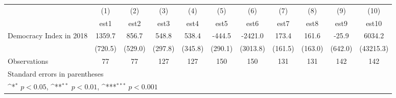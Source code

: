 {
\def\sym#1{\ifmmode^{#1}\else\(^{#1}\)\fi}
\begin{tabular}{l*{10}{c}}
\hline\hline
                    &\multicolumn{1}{c}{(1)}         &\multicolumn{1}{c}{(2)}         &\multicolumn{1}{c}{(3)}         &\multicolumn{1}{c}{(4)}         &\multicolumn{1}{c}{(5)}         &\multicolumn{1}{c}{(6)}         &\multicolumn{1}{c}{(7)}         &\multicolumn{1}{c}{(8)}         &\multicolumn{1}{c}{(9)}         &\multicolumn{1}{c}{(10)}         \\
                    &        est1         &        est2         &        est3         &        est4         &        est5         &        est6         &        est7         &        est8         &        est9         &       est10         \\
\hline
Democracy Index in 2018&      1359.7         &       856.7         &       548.8         &       538.4         &      -444.5         &     -2421.0         &       173.4         &       161.6         &       -25.9         &      6034.2         \\
                    &     (720.5)         &     (529.0)         &     (297.8)         &     (345.8)         &     (290.1)         &    (3013.8)         &     (161.5)         &     (163.0)         &     (642.0)         &   (43215.3)         \\
\hline
Observations        &          77         &          77         &         127         &         127         &         150         &         150         &         131         &         131         &         142         &         142         \\
\hline\hline
\multicolumn{11}{l}{\footnotesize Standard errors in parentheses}\\
\multicolumn{11}{l}{\footnotesize \sym{*} \(p<0.05\), \sym{**} \(p<0.01\), \sym{***} \(p<0.001\)}\\
\end{tabular}
}
